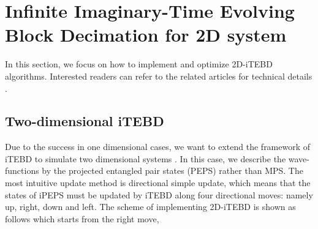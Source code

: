 \section{Infinite Imaginary-Time Evolving Block Decimation for 2D system}

In this section, we focus on how to implement and optimize 2D-iTEBD algorithms. Interested readers can refer to the related articles for technical details  \cite{PhysRevLett.99.220405, PhysRevLett.101.090603, PhysRevB.78.155117}.
\subsection{Two-dimensional iTEBD}
\label{2ditebd}

Due to the success in one dimensional cases, we want to extend the framework of iTEBD to simulate two dimensional systems . In this case, we describe the wave-functions by the projected entangled pair states (PEPS) rather than MPS. 
The most intuitive update method is directional simple update, which means that the states of iPEPS must be updated by iTEBD along four directional moves: namely up, right, down and left. The scheme of implementing 2D-iTEBD is shown as follows which starts from the right move,

